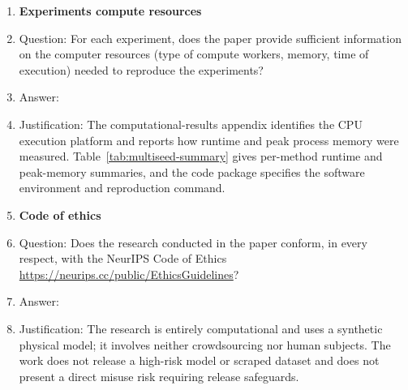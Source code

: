 \begin{enumerate}
\item {\bf Experiments compute resources}
    \item[] Question: For each experiment, does the paper provide sufficient information on the computer resources (type of compute workers, memory, time of execution) needed to reproduce the experiments?
    \item[] Answer: \answerYes{}
    \item[] Justification: The computational-results appendix identifies the CPU execution platform and
    reports how runtime and peak process memory were measured.
    Table~\ref{tab:multiseed-summary} gives per-method runtime and peak-memory
    summaries, and the code package specifies the software environment and
    reproduction command.
    
\item {\bf Code of ethics}
    \item[] Question: Does the research conducted in the paper conform, in every respect, with the NeurIPS Code of Ethics \url{https://neurips.cc/public/EthicsGuidelines}?
    \item[] Answer: \answerYes{} %
    \item[] Justification: The research is entirely computational and uses a synthetic physical model; it involves neither crowdsourcing nor human subjects. The work does not release a high-risk model or scraped dataset and does not present a direct misuse risk requiring release safeguards. 



\end{enumerate}
